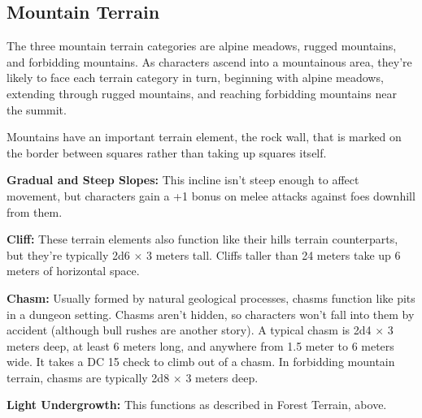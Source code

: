\subsection{Mountain Terrain}
The three mountain terrain categories are alpine meadows, rugged mountains, and forbidding mountains. As characters ascend into a mountainous area, they're likely to face each terrain category in turn, beginning with alpine meadows, extending through rugged mountains, and reaching forbidding mountains near the summit.

Mountains have an important terrain element, the rock wall, that is marked on the border between squares rather than taking up squares itself.


\textbf{Gradual and Steep Slopes:} This incline isn't steep enough to affect movement, but characters gain a +1 bonus on melee attacks against foes downhill from them.

\textbf{Cliff:} These terrain elements also function like their hills terrain counterparts, but they're typically 2d6 $\times$ 3 meters tall. Cliffs taller than 24 meters take up 6 meters of horizontal space.

\textbf{Chasm:} Usually formed by natural geological processes, chasms function like pits in a dungeon setting. Chasms aren't hidden, so characters won't fall into them by accident (although bull rushes are another story). A typical chasm is 2d4 $\times$ 3 meters deep, at least 6 meters long, and anywhere from 1.5 meter to 6 meters wide. It takes a DC 15  check to climb out of a chasm. In forbidding mountain terrain, chasms are typically 2d8 $\times$ 3 meters deep.

\textbf{Light Undergrowth:} This functions as described in Forest Terrain, above.

